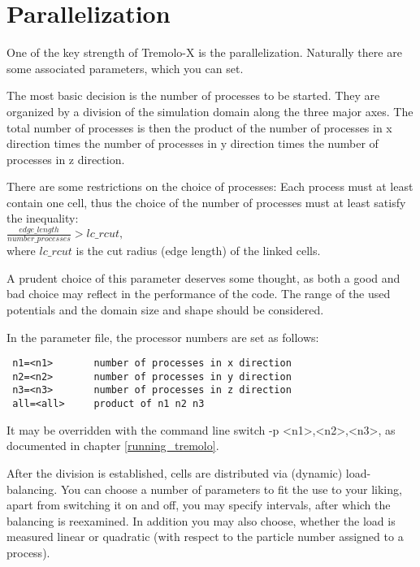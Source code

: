 \chapter{Parallelization}
\label{parallelization}

One of the key strength of Tremolo-X is the parallelization.
Naturally there are some associated parameters, which you can set.

The most basic decision is the number of processes to be started.
They are organized by a division of the simulation domain along the
three major axes. The total number of processes is then the product
of the number of processes in x direction times the number of processes
in y direction times the number of processes in z direction.

There are some restrictions on the choice of processes:
Each process must at least contain one cell, thus the choice of the 
number of processes must at least satisfy the inequality:\\
$\frac{edge\_length}{number\_processes} > lc\_rcut,$\\
where $lc\_rcut$ is the cut radius (edge length) of the linked cells.

A prudent choice of this parameter deserves some thought, as both a good and
bad choice may reflect in the performance of the code. The range of the used potentials and the domain size and shape
should be considered.

\bigbreak
In the parameter file, the processor numbers are set as follows:
\begin{lstlisting}
 n1=<n1>       number of processes in x direction
 n2=<n2>       number of processes in y direction
 n3=<n3>       number of processes in z direction
 all=<all>     product of n1 n2 n3
\end{lstlisting}

It may be overridden with the command line switch -p <n1>,<n2>,<n3>, as documented in chapter \ref{running_tremolo}.

\bigbreak

After the division is established, cells are distributed via (dynamic) load-balancing. You can choose a number of parameters
to fit the use to your liking, apart from switching it on and off, you may specify intervals, after which the balancing is 
reexamined. In addition you may also choose, whether the load is measured linear or quadratic (with respect to the particle number assigned to a process).




